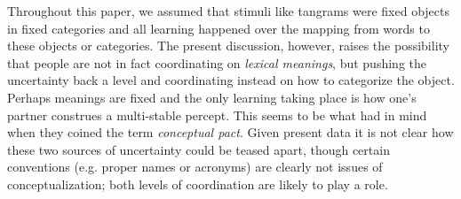 Throughout this paper, we assumed that stimuli like tangrams were fixed objects in fixed categories and all learning happened over the mapping from words to these objects or categories. The present discussion, however, raises the possibility that people are not in fact coordinating on \emph{lexical meanings}, but pushing the uncertainty back a level and coordinating instead on how to categorize the object. Perhaps meanings are fixed and the only learning taking place is how one's partner construes a multi-stable percept. This seems to be what  had in mind when they coined the term \emph{conceptual pact}. Given present data it is not clear how these two sources of uncertainty could be teased apart, though certain conventions (e.g. proper names or acronyms) are clearly not issues of conceptualization; both levels of coordination are likely to play a role. 


